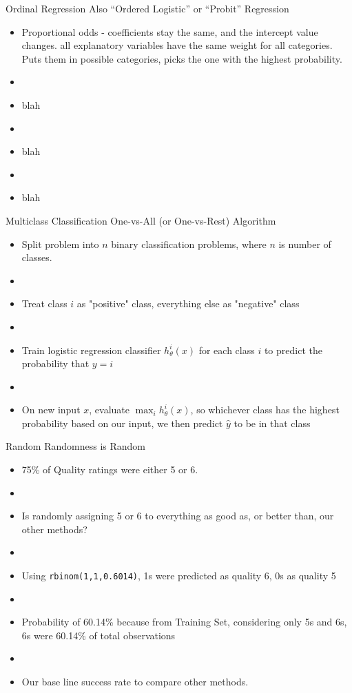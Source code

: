 \documentclass{beamer}
\begin{document}
\begin{frame}{Ordinal Regression}
	Also ``Ordered Logistic'' or ``Probit'' Regression
	\begin{itemize}
	\item Proportional odds - coefficients stay the same, and the intercept value changes. all explanatory variables have the same weight for all categories. Puts them in possible categories, picks the one with the highest probability. 
	\item[]
	\item blah
	\item[]
	\item blah
	\item[]
	\item blah
	\end{itemize}
\end{frame}

\begin{frame}{Multiclass Classification}
	One-vs-All (or One-vs-Rest) Algorithm
	\begin{itemize}
	\item Split problem into $n$ binary classification problems, where $n$ is number of classes.
	\item[]
	\item Treat class $i$ as "positive" class, everything else as "negative" class
	\item[]
	\item Train logistic regression classifier $h_{\theta}^{i}(x)$ for each class $i$ to predict the probability that $y=i$
	\item[]
	\item On new input $x$, evaluate $\max_{i}h_{\theta}^{i}(x)$, so whichever class has the highest probability based on our input, we then predict $\hat{y}$ to be in that class
	\end{itemize}

\end{frame}

\begin{frame}{Random Randomness is Random}
	\begin{itemize}
	\item 75\% of Quality ratings were either 5 or 6. 
	\item[]
	\item Is randomly assigning 5 or 6 to everything as good as, or better than, our other methods?
	\item[]
	\item Using \texttt{rbinom(1,1,0.6014)}, 1s were predicted as quality 6, 0s as quality 5
	\item[]
	\item Probability of 60.14\% because from Training Set, considering only 5s and 6s, 6s were 60.14\% of total observations
	\item[]
	\item Our base line success rate to compare other methods.
	\end{itemize}
\end{frame}
\end{document}
